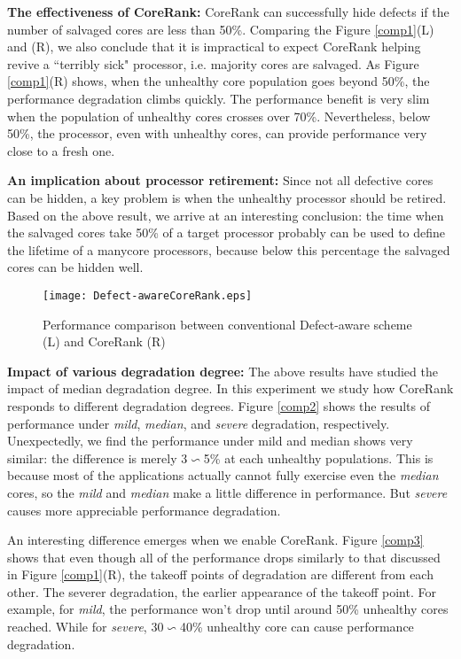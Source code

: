 \textbf{The effectiveness of CoreRank:} CoreRank can successfully hide defects if the number of salvaged cores are less than 50\%. Comparing the Figure \ref{comp1}(L) and (R), we also conclude that it is  impractical to expect CoreRank helping revive a ``terribly sick" processor, i.e.  majority cores are salvaged.    As Figure \ref{comp1}(R) shows, when the unhealthy core population goes beyond 50\%, the performance degradation climbs quickly. The performance benefit is very slim  when the population of unhealthy cores crosses over 70\%.  Nevertheless, below 50\%, the processor, even with unhealthy cores,  can provide performance very close to a fresh one.

\textbf{An implication about processor retirement: } Since not all defective cores can be hidden, a key problem is when the unhealthy processor should be retired.  Based on the above result, we arrive at an interesting conclusion: the time when the salvaged cores take 50\% of a target processor probably can be used to define the lifetime of a manycore processors, because below this percentage the salvaged  cores can be hidden well.

\begin{figure*}[t]
 \centering
  \texttt{[image: Defect-awareCoreRank.eps]}\\
\caption{Performance comparison between conventional Defect-aware scheme (L) and  CoreRank (R)}
\label{compdefectaware}
\end{figure*}

\textbf{Impact of various degradation degree:} The above results have studied the impact of median degradation degree. In this experiment we study how CoreRank responds to different degradation degrees. Figure \ref{comp2} shows the results of performance under \emph{mild}, \emph{median}, and \emph{severe} degradation, respectively.  Unexpectedly, we find the performance under mild and median shows very similar: the difference is merely 3$\backsim$5\% at each unhealthy populations. This is because most of the applications actually cannot fully exercise even the \emph{median} cores, so the \emph{mild} and \emph{median} make a little difference in performance.    But \emph{severe} causes more appreciable performance degradation.

An interesting difference emerges when we enable CoreRank.  Figure \ref{comp3} shows that even though all of the performance drops similarly to  that discussed in Figure \ref{comp1}(R),  the  takeoff points of degradation are different from each other.  The  severer degradation, the earlier appearance of the takeoff point.  For example, for \emph{mild}, the performance won't drop until around 50\% unhealthy cores reached. While for \emph{severe}, 30$\backsim$40\% unhealthy core can cause performance degradation.


